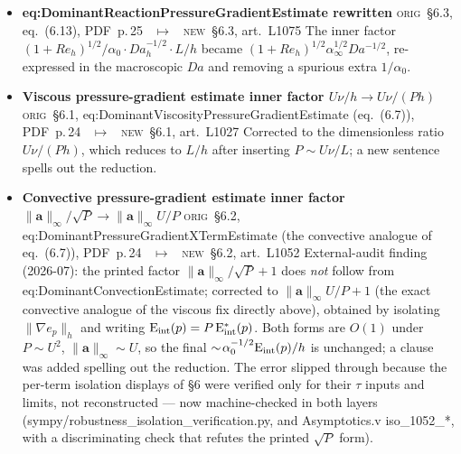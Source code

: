 \documentclass[11pt]{article}
\newcommand{\Orig}{\textcolor{origc}{\footnotesize\textsc{orig}}}
\newcommand{\New}{\textcolor{newc}{\footnotesize\textsc{new}}}
\newcommand{\code}[1]{\textcolor{newc}{\ttfamily\small #1}}
\newcommand{\pdfp}[1]{PDF~p.\,#1}
\newcommand{\artl}[1]{art.\ L#1}       %
\newcommand{\ch}[4]{%
  \item \textbf{#1}\newline
    {\footnotesize\Orig\ #2 \ \textcolor{locc}{$\longmapsto$} \ \New\ #3}\newline
    #4}
\begin{document}
\begin{itemize}
\ch{\code{eq:DominantReactionPressureGradientEstimate} rewritten}
   {\S6.3, eq.~(6.13), \pdfp{25}}
   {\S6.3, \artl{1075}}
   {The inner factor $(1+Re_h)^{1/2}/\alpha_0\cdot Da_h^{-1/2}\cdot L/h$ became
    $(1+Re_h)^{1/2}\alpha_\infty^{1/2}Da^{-1/2}$, re-expressed in the macroscopic $Da$ and removing a
    spurious extra $1/\alpha_0$.}
\ch{Viscous pressure-gradient estimate inner factor $U\nu/h\to U\nu/(Ph)$}
   {\S6.1, \code{eq:DominantViscosityPressureGradientEstimate} (eq.~(6.7)), \pdfp{24}}
   {\S6.1, \artl{1027}}
   {Corrected to the dimensionless ratio $U\nu/(Ph)$, which reduces to $L/h$ after inserting
    $P\!\sim\!U\nu/L$; a new sentence spells out the reduction.}
\ch{Convective pressure-gradient estimate inner factor $\|\boldsymbol{a}\|_\infty/\sqrt{P}\to\|\boldsymbol{a}\|_\infty U/P$}
   {\S6.2, \code{eq:DominantPressureGradientXTermEstimate} (the convective analogue of eq.~(6.7)), \pdfp{24}}
   {\S6.2, \artl{1052}}
   {External-audit finding (2026-07): the printed factor $\|\boldsymbol{a}\|_\infty/\sqrt P+1$ does \emph{not}
    follow from \code{eq:DominantConvectionEstimate}; corrected to $\|\boldsymbol{a}\|_\infty U/P+1$ (the exact
    convective analogue of the viscous fix directly above), obtained by isolating $\|\nabla e_p\|_h$ and
    writing $\mathrm E_{\rm int}(p)=P\,\mathrm E^*_{\rm int}(p)$. Both forms are $O(1)$ under
    $P\!\sim\!U^2$, $\|\boldsymbol{a}\|_\infty\!\sim\!U$, so the final $\sim\!\alpha_0^{-1/2}\mathrm E_{\rm int}(p)/h$
    is unchanged; a clause was added spelling out the reduction. The error slipped through because the
    per-term isolation displays of \S6 were verified only for their $\tau$ inputs and limits, not
    reconstructed --- now machine-checked in both layers
    (\code{sympy/robustness\_isolation\_verification.py}, and \code{Asymptotics.v} \code{iso\_1052\_*},
    with a discriminating check that refutes the printed $\sqrt P$ form).}
\end{itemize}
\end{document}
